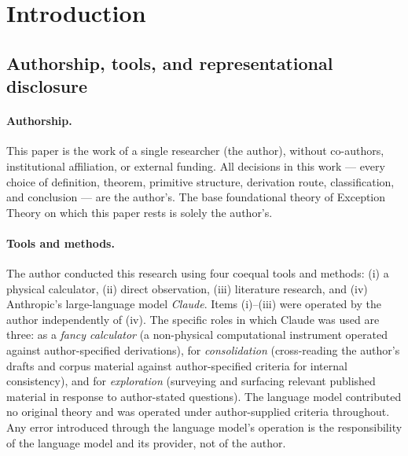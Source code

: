 \documentclass[11pt,a4paper]{article}
\theoremstyle{definition}
\theoremstyle{remark}
\begin{document}
\tableofcontents

\section{Introduction}

\subsection{Authorship, tools, and representational disclosure}\label{subsec:disclosures}

\paragraph{Authorship.} This paper is the work of a single researcher (the author), without co-authors, institutional affiliation, or external funding. All decisions in this work --- every choice of definition, theorem, primitive structure, derivation route, classification, and conclusion --- are the author's. The base foundational theory of Exception Theory on which this paper rests is solely the author's.

\paragraph{Tools and methods.} The author conducted this research using four coequal tools and methods: (i) a physical calculator, (ii) direct observation, (iii) literature research, and (iv) Anthropic's large-language model \emph{Claude}. Items (i)--(iii) were operated by the author independently of (iv). The specific roles in which Claude was used are three: as a \emph{fancy calculator} (a non-physical computational instrument operated against author-specified derivations), for \emph{consolidation} (cross-reading the author's drafts and corpus material against author-specified criteria for internal consistency), and for \emph{exploration} (surveying and surfacing relevant published material in response to author-stated questions). The language model contributed no original theory and was operated under author-supplied criteria throughout. Any error introduced through the language model's operation is the responsibility of the language model and its provider, not of the author.
\end{document}
